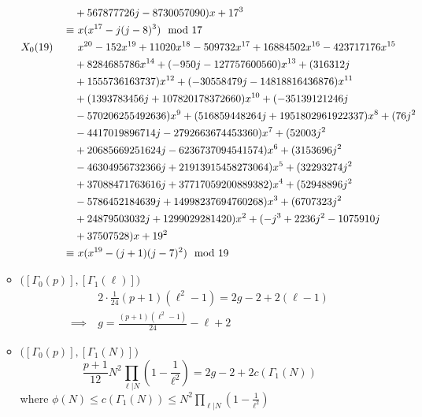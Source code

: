 \documentclass{rs}
\theoremstyle{definition}
\theoremstyle{remark}
\newcommand{\md}{~~{\rm mod}~}
\newcommand{\G}{\Gamma}
\renewcommand{\=}{\approx}
\renewcommand{\-}{\sim}
\numberwithin{equation}{section}
\numberwithin{thm}{section}
\begin{document}
\begin{enumerate}[(i)]
\begin{itemize}
\begin{equation*}
\begin{split}
                   & +567877726 j-8730057090) x+17^3 \\
            \equiv & ~ x (x^{17} - j (j - 8)^3) \md 17 \\
    X_0(19) \qquad & ~ x^{20}-152 x^{19}+11020 x^{18}-509732 x^{17}+16884502 x^{16}-423717176 x^{15} \\
                   & +8284685786 x^{14}+(-950 j-127757600560) x^{13}+(316312 j \\
                   & +1555736163737) x^{12}+(-30558479 j-14818816436876) x^{11} \\
                   & +(1393783456 j+107820178372660) x^{10}+(-35139121246 j \\
                   & -570206255492636) x^9+(516859448264 j+1951802961922337) x^8+(76 j^2 \\
                   & -4417019896714 j-2792663674453360) x^7+(52003 j^2 \\
                   & +20685669251624 j-6236737094541574) x^6+(3153696 j^2 \\
                   & -46304956732366 j+21913915458273064) x^5+(32293274 j^2 \\
                   & +37088471763616 j+37717059200889382) x^4+(52948896 j^2 \\
                   & -5786452184639 j+14998237694760268) x^3+(6707323 j^2 \\
                   & +24879503032 j+1299029281420) x^2+(-j^3+2236 j^2-1075910 j \\
                   & +37507528) x+19^2 \\
            \equiv & ~ x (x^{19} - (j + 1) (j - 7)^2) \md 19 
   \end{split}
  \end{equation*}

  \item $\big( [\G_0(p)], [\G_1(\ell)] \big)$ 
  \begin{equation*}
   \begin{split}
    & ~ 2 \cdot \frac{1}{24} (p + 1) (\ell^2 - 1) = 2 g - 2 + 2 (\ell - 1) \\
    \implies & ~ g = \frac{(p + 1) (\ell^2 - 1)}{24} - \ell + 2 
   \end{split}
  \end{equation*}

  \item $\big( [\G_0(p)], [\G_1(N)] \big)$ 
  \[
   \frac{p + 1}{12} N^2 \prod_{\ell | N} \left( 1 - \frac{1}{\ell^2} \right) = 2 g - 2 + 2 c(\G_1(N)) 
  \]
  where $\phi(N) \leq c(\G_1(N)) \leq N^2 \prod_{\ell | N} \left( 1 - \frac{1}{\ell^2} \right)$ 


\end{itemize}
\end{enumerate}
\end{document}
